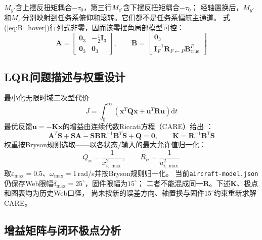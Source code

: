 $M_{y'}$含上摆反扭矩耦合$-\tau_0$，第三行$M_{z'}$含下摆反扭矩耦合$-\tau_0$；
经轴置换后，$M_{y'}$和$M_{z'}$分别映射到任务系俯仰和滚转。它们都不是任务系偏航主通道。
式(\ref{eq:B_hover})行列式非零，因而该零摆角局部模型可控：
\begin{equation}
    \mathbf{A} = \begin{bmatrix} \mathbf{0}_3 & -\frac{1}{2}\mathbf{I}_3 \\ \mathbf{0}_3 & \mathbf{0}_3 \end{bmatrix},
    \qquad
    \mathbf{B} = \begin{bmatrix} \mathbf{0}_3 \\ \mathbf I_F^{-1}\mathbf R_{F\leftarrow P}\mathbf B_{\mathrm{true}}^P \end{bmatrix}
    \label{eq:lqr_AB}
\end{equation}

\subsection{LQR问题描述与权重设计}
\label{sec:lqr_design}

最小化无限时域二次型代价
\begin{equation}
    J = \int_0^{\infty}\left(\mathbf{x}^T\mathbf{Q}\mathbf{x} + \mathbf{u}^T\mathbf{R}\mathbf{u}\right)\mathrm{d}t
    \label{eq:lqr_cost}
\end{equation}
最优反馈$\mathbf{u}=-\mathbf{K}\mathbf{x}$的增益由连续代数Riccati方程（CARE）给出
\cite{stengel2004flight}：
\begin{equation}
    \mathbf{A}^T\mathbf{S} + \mathbf{S}\mathbf{A} - \mathbf{S}\mathbf{B}\mathbf{R}^{-1}\mathbf{B}^T\mathbf{S} + \mathbf{Q} = \mathbf{0},
    \qquad
    \mathbf{K} = \mathbf{R}^{-1}\mathbf{B}^T\mathbf{S}
    \label{eq:care}
\end{equation}
权重按Bryson规则选取——以各状态/输入的最大允许值归一化：
\begin{equation}
    Q_{ii} = \frac{1}{x_{i,\max}^2},\qquad R_{ii} = \frac{1}{u_{i,\max}^2}
    \label{eq:bryson}
\end{equation}
取$\varepsilon_{\max}=0.5$、$\omega_{\max}=1$\,rad/s并按Bryson规则归一化。
当前\texttt{aircraft-model.json}仍保存Web限幅$\delta_{\max}=25^\circ$，固件限幅为$15^\circ$；
二者不能混成同一$\mathbf R$。下述$\mathbf K$、极点和图表均为历史Web口径，
尚未按新的误差方向、轴置换与固件$15^\circ$约束重新求解CARE。

\subsection{增益矩阵与闭环极点分析}
\label{sec:lqr_poles}

